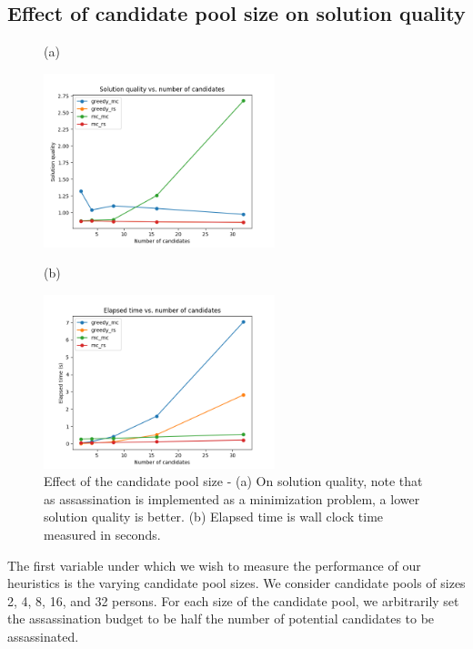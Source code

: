 \subsection{Effect of candidate pool size on solution quality}
\label{section:num-candidates}

\begin{figure}[h!]
    \centering
    (a) 
    
    \includegraphics[width=0.6\textwidth]{figs/num_candidates_multi_ground_set_plot.png}
    
    (b) 
    
    \includegraphics[width=0.6\textwidth]{figs/num_candidates_multi_ground_set_times_plot.png}
    \caption{ Effect of the candidate pool size - (a) On solution quality, note that as assassination is implemented as a minimization problem, a lower solution quality is better. (b) Elapsed time is wall clock time measured in seconds.}
    \label{fig:num-candidates}
\end{figure} 

The first variable under which we wish to measure the performance of our heuristics is the varying candidate pool sizes.
We consider candidate pools of sizes 2, 4, 8, 16, and 32 persons.
For each size of the candidate pool, we arbitrarily set the assassination budget to be half the number of potential candidates to be assassinated.

